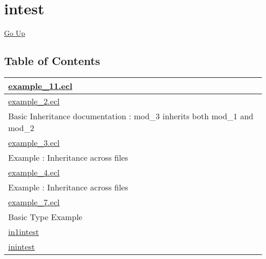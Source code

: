 \chapter*{\color{headtoc} intest}
\hypertarget{ecldoc:toc:root/intest}{}
\hyperlink{ecldoc:toc:root}{Go Up}


\section*{Table of Contents}
{\renewcommand{\arraystretch}{1.5}
\begin{longtable}{|p{\textwidth}|}
\hline
\hyperlink{ecldoc:toc:intest.example_11}{example\_11.ecl} \\
\hline
\hyperlink{ecldoc:toc:intest.example_2}{example\_2.ecl} \\
Basic Inheritance documentation : mod\_3 inherits both mod\_1 and mod\_2 \\
\hline
\hyperlink{ecldoc:toc:intest.example_3}{example\_3.ecl} \\
Example : Inheritance across files \\
\hline
\hyperlink{ecldoc:toc:intest.example_4}{example\_4.ecl} \\
Example : Inheritance across files \\
\hline
\hyperlink{ecldoc:toc:intest.example_7}{example\_7.ecl} \\
Basic Type Example \\
\hline
\hyperlink{ecldoc:toc:root/intest/in1intest}{in1intest} \\
\hline
\hyperlink{ecldoc:toc:root/intest/inintest}{inintest} \\
\hline
\end{longtable}
}








